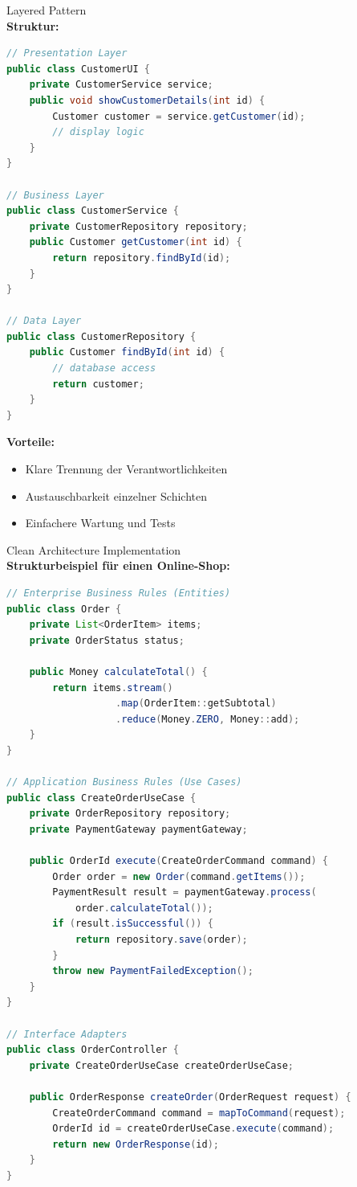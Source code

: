 \begin{example2}{Layered Pattern}\\
\textbf{Struktur:}
\begin{lstlisting}[language=Java, style=basesmol]
// Presentation Layer
public class CustomerUI {
    private CustomerService service;
    public void showCustomerDetails(int id) {
        Customer customer = service.getCustomer(id);
        // display logic
    }
}

// Business Layer
public class CustomerService {
    private CustomerRepository repository;
    public Customer getCustomer(int id) {
        return repository.findById(id);
    }
}

// Data Layer
public class CustomerRepository {
    public Customer findById(int id) {
        // database access
        return customer;
    }
}
\end{lstlisting}

\textbf{Vorteile:}
\begin{itemize}
    \item Klare Trennung der Verantwortlichkeiten
    \item Austauschbarkeit einzelner Schichten
    \item Einfachere Wartung und Tests
\end{itemize}
\end{example2}



\begin{example2}{Clean Architecture Implementation}\\
\textbf{Strukturbeispiel für einen Online-Shop:}

\begin{lstlisting}[language=Java, style=basesmol]
// Enterprise Business Rules (Entities)
public class Order {
    private List<OrderItem> items;
    private OrderStatus status;
    
    public Money calculateTotal() {
        return items.stream()
                   .map(OrderItem::getSubtotal)
                   .reduce(Money.ZERO, Money::add);
    }
}

// Application Business Rules (Use Cases)
public class CreateOrderUseCase {
    private OrderRepository repository;
    private PaymentGateway paymentGateway;
    
    public OrderId execute(CreateOrderCommand command) {
        Order order = new Order(command.getItems());
        PaymentResult result = paymentGateway.process(
            order.calculateTotal());
        if (result.isSuccessful()) {
            return repository.save(order);
        }
        throw new PaymentFailedException();
    }
}

// Interface Adapters
public class OrderController {
    private CreateOrderUseCase createOrderUseCase;
    
    public OrderResponse createOrder(OrderRequest request) {
        CreateOrderCommand command = mapToCommand(request);
        OrderId id = createOrderUseCase.execute(command);
        return new OrderResponse(id);
    }
}
\end{lstlisting}
\end{example2}

